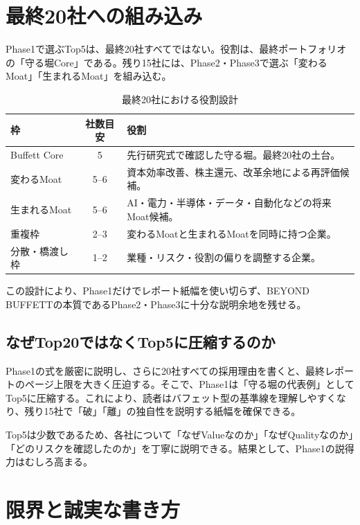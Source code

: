 \documentclass[11pt,a4paper]{article}
\begin{document}
\clearpage
\section{最終20社への組み込み}

Phase1で選ぶTop5は、最終20社すべてではない。役割は、最終ポートフォリオの「守る堀Core」である。残り15社には、Phase2・Phase3で選ぶ「変わるMoat」「生まれるMoat」を組み込む。

\begin{table}[tbp]
\caption{最終20社における役割設計}
\label{tab:final20-structure}
\centering
\small
\begin{tabularx}{\linewidth}{p{35mm}cY}
\toprule
枠 & 社数目安 & 役割 \\
\midrule
Buffett Core & 5 & 先行研究式で確認した守る堀。最終20社の土台。 \\
変わるMoat & 5--6 & 資本効率改善、株主還元、改革余地による再評価候補。 \\
生まれるMoat & 5--6 & AI・電力・半導体・データ・自動化などの将来Moat候補。 \\
重複枠 & 2--3 & 変わるMoatと生まれるMoatを同時に持つ企業。 \\
分散・橋渡し枠 & 1--2 & 業種・リスク・役割の偏りを調整する企業。 \\
\bottomrule
\end{tabularx}
\end{table}

この設計により、Phase1だけでレポート紙幅を使い切らず、BEYOND BUFFETTの本質であるPhase2・Phase3に十分な説明余地を残せる。

\subsection{なぜTop20ではなくTop5に圧縮するのか}

Phase1の式を厳密に説明し、さらに20社すべての採用理由を書くと、最終レポートのページ上限を大きく圧迫する。そこで、Phase1は「守る堀の代表例」としてTop5に圧縮する。これにより、読者はバフェット型の基準線を理解しやすくなり、残り15社で「破」「離」の独自性を説明する紙幅を確保できる。

Top5は少数であるため、各社について「なぜValueなのか」「なぜQualityなのか」「どのリスクを確認したのか」を丁寧に説明できる。結果として、Phase1の説得力はむしろ高まる。


\clearpage
\section{限界と誠実な書き方}
\end{document}
